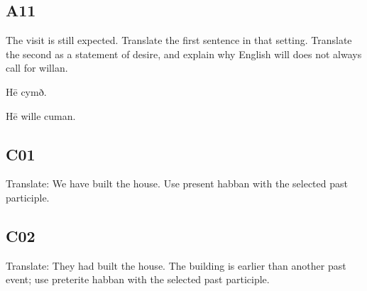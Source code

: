 \subsection*{A11}

\par\begin{minipage}{\linewidth}\raggedright
The visit is still expected. Translate the first sentence in that setting. Translate the second as a statement of desire, and explain why English will does not always call for willan.

Hē cymð.

Hē wille cuman.

\end{minipage}\par\addvspace{4pt}

\subsection*{C01}

\par\begin{minipage}{\linewidth}\raggedright
Translate: We have built the house. Use present habban with the selected past participle.

\end{minipage}\par\addvspace{4pt}

\subsection*{C02}

\par\begin{minipage}{\linewidth}\raggedright
Translate: They had built the house. The building is earlier than another past event; use preterite habban with the selected past participle.

\end{minipage}\par\addvspace{4pt}

